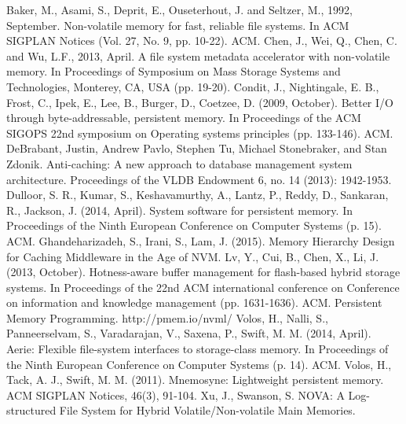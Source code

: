 \begin{thebibliography}{99}
 Baker, M., Asami, S., Deprit, E., Ouseterhout, J. and Seltzer, M., 1992, September. Non-volatile memory for fast, reliable file systems. In ACM SIGPLAN Notices (Vol. 27, No. 9, pp. 10-22). ACM.	
 Chen, J., Wei, Q., Chen, C. and Wu, L.F., 2013, April. A file system metadata accelerator with non-volatile memory. In Proceedings of Symposium on Mass Storage Systems and Technologies, Monterey, CA, USA (pp. 19-20).
 Condit, J., Nightingale, E. B., Frost, C., Ipek, E., Lee, B., Burger, D.,  Coetzee, D. (2009, October). Better I/O through byte-addressable, persistent memory. In Proceedings of the ACM SIGOPS 22nd symposium on Operating systems principles (pp. 133-146). ACM.
 DeBrabant, Justin, Andrew Pavlo, Stephen Tu, Michael Stonebraker, and Stan Zdonik. Anti-caching: A new approach to database management system architecture. Proceedings of the VLDB Endowment 6, no. 14 (2013): 1942-1953.
 Dulloor, S. R., Kumar, S., Keshavamurthy, A., Lantz, P., Reddy, D., Sankaran, R., Jackson, J. (2014, April). System software for persistent memory. In Proceedings of the Ninth European Conference on Computer Systems (p. 15). ACM.
 Ghandeharizadeh, S., Irani, S., Lam, J. (2015). Memory Hierarchy Design for Caching Middleware in the Age of NVM.
 Lv, Y., Cui, B., Chen, X., Li, J. (2013, October). Hotness-aware buffer management for flash-based hybrid storage systems. In Proceedings of the 22nd ACM international conference on Conference on information and knowledge management (pp. 1631-1636). ACM.	
 Persistent Memory Programming. http://pmem.io/nvml/
 Volos, H., Nalli, S., Panneerselvam, S., Varadarajan, V., Saxena, P., Swift, M. M. (2014, April). Aerie: Flexible file-system interfaces to storage-class memory. In Proceedings of the Ninth European Conference on Computer Systems (p. 14). ACM.
 Volos, H., Tack, A. J., Swift, M. M. (2011). Mnemosyne: Lightweight persistent memory. ACM SIGPLAN Notices, 46(3), 91-104.	
 Xu, J., Swanson, S. NOVA: A Log-structured File System for Hybrid Volatile/Non-volatile Main Memories.
\end{thebibliography}


